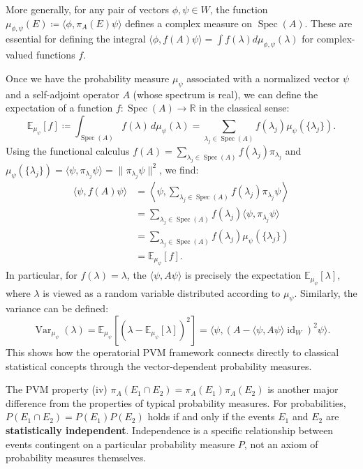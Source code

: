 More generally, for any pair of vectors $\phi, \psi \in W$, the function $\mu_{\phi,\psi}(E) \coloneqq \langle \phi, \pi_A(E)\psi \rangle$ defines a complex measure on $\operatorname{Spec}(A)$. These are essential for defining the integral $\langle \phi, f(A)\psi \rangle = \int f(\lambda)d\mu_{\phi,\psi}(\lambda)$ for complex-valued functions $f$.

Once we have the probability measure $\mu_\psi$ associated with a normalized vector $\psi$ and a self-adjoint operator $A$ (whose spectrum is real), we can define the expectation of a function $f: \operatorname{Spec}(A) \to \mathbb{R}$ in the classical sense:
\[ \mathbb{E}_{\mu_\psi}[f] \coloneqq \int_{\operatorname{Spec}(A)} f(\lambda) \, d\mu_\psi(\lambda) = \sum_{\lambda_j \in \operatorname{Spec}(A)} f(\lambda_j) \mu_\psi(\{\lambda_j\}). \]
Using the functional calculus $f(A) = \sum_{\lambda_j \in \operatorname{Spec}(A)} f(\lambda_j) \pi_{\lambda_j}$ and $\mu_\psi(\{\lambda_j\}) = \langle \psi, \pi_{\lambda_j}\psi \rangle = \|\pi_{\lambda_j}\psi\|^2$, we find:
\begin{align*} \langle \psi, f(A)\psi \rangle &= \left\langle \psi, \sum_{\lambda_j \in \operatorname{Spec}(A)} f(\lambda_j) \pi_{\lambda_j} \psi \right\rangle \\ &= \sum_{\lambda_j \in \operatorname{Spec}(A)} f(\lambda_j) \langle \psi, \pi_{\lambda_j} \psi \rangle \\ &= \sum_{\lambda_j \in \operatorname{Spec}(A)} f(\lambda_j) \mu_\psi(\{\lambda_j\}) \\ &= \mathbb{E}_{\mu_\psi}[f]. \end{align*}
In particular, for $f(\lambda) = \lambda$, the  $\langle \psi, A\psi \rangle$ is precisely the expectation $\mathbb{E}_{\mu_\psi}[\lambda]$, where $\lambda$ is viewed as a random variable distributed according to $\mu_\psi$. Similarly, the variance can be defined:
\[ \operatorname{Var}_{\mu_\psi}(\lambda) = \mathbb{E}_{\mu_\psi}[(\lambda - \mathbb{E}_{\mu_\psi}[\lambda])^2] = \langle \psi, (A - \langle \psi, A\psi \rangle \operatorname{id}_W)^2 \psi \rangle. \]
This shows how the operatorial PVM framework connects directly to classical statistical concepts through the vector-dependent probability measures.

The PVM property (iv) $\pi_A(E_1 \cap E_2) = \pi_A(E_1) \pi_A(E_2)$ is another major difference from the properties of typical probability measures. For probabilities, $P(E_1 \cap E_2) = P(E_1)P(E_2)$ holds if and only if the events $E_1$ and $E_2$ are \textbf{statistically independent}. Independence is a specific relationship between events contingent on a particular probability measure $P$, not an axiom of probability measures themselves.

